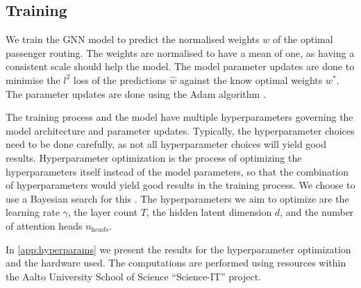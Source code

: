 \documentclass[english, 12pt, a4paper, sci, utf8, a-2b, online]{aaltothesis}
\newcommand{\draft}[1]{\textcolor{red}{\em (DRAFT) #1}}
\begin{document}
\subsection{Training}
\label{sec:training}

We train the GNN model to predict the normalised weights $w$ of the optimal passenger routing. The weights are normalised to have a mean of one, as having a consistent scale should help the model. The model parameter updates are done to minimise the $l^2$ loss of the predictions $\hat{w}$ against the know optimal weights $w^*$. The parameter updates are done using the Adam algorithm \cite{adam-2014}.

The training process and the model have multiple hyperparameters governing the model architecture and parameter updates. Typically, the hyperparameter choices need to be done carefully, as not all hyperparameter choices will yield good results. Hyperparameter optimization is the process of optimizing the hyperparameters itself instead of the model parameters, so that the combination of hyperparameters would yield good results in the training process. We choose to use a Bayesian search for this \cite{bayes-hyper}. The hyperparameters we aim to optimize are the learning rate $\gamma$, the layer count $T$, the hidden latent dimension $d$, and the number of attention heads $n_\textit{heads}$.

In \cref{app:hyperparams} we present the results for the hyperparameter optimization and the hardware used. The computations are performed using resources within the Aalto University School of Science “Science-IT” project.

    
\end{document}
